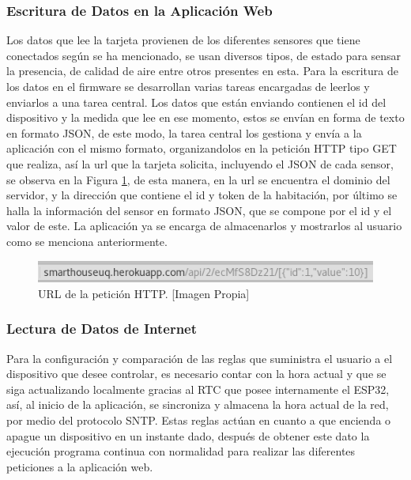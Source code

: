 \subsubsection{Escritura de Datos en la Aplicación Web}

Los datos que lee la tarjeta provienen de los diferentes sensores que tiene conectados según se ha mencionado, se usan diversos tipos, de estado para sensar la presencia, de calidad de aire entre otros presentes en esta. Para la escritura de los datos en el firmware se desarrollan varias tareas encargadas de leerlos y enviarlos a una tarea central. Los datos que están enviando contienen el id del dispositivo y la medida que lee en ese momento, estos se envían en forma de texto en formato JSON, de este modo, la tarea central los gestiona y envía a la aplicación con el mismo formato, organizandolos en la petición HTTP tipo GET que realiza, así la url que la tarjeta solicita, incluyendo el JSON de cada sensor, se observa en la Figura \ref{fig:json}, de esta manera, en la url se encuentra el dominio del servidor, y la dirección que contiene el id y token de la habitación, por último se halla la información del sensor en formato JSON, que se compone por el id y el valor de este. La aplicación ya se encarga de almacenarlos y mostrarlos al usuario como se menciona anteriormente.

\begin{figure}[H]
	\centering
	\caption[URL de la petición HTTP.]{URL de la petición HTTP. [Imagen Propia]}
	\label{fig:json}
	\includegraphics[width=0.7\linewidth]{Imagenes/JSON}
\end{figure}


\subsubsection{Lectura de Datos de Internet}

Para la configuración y comparación de las reglas que suministra el usuario a el dispositivo que desee controlar, es necesario contar con la hora actual y que se siga actualizando localmente gracias al RTC que posee internamente el ESP32, así, al inicio de la aplicación, se sincroniza y almacena la hora actual de la red, por medio del protocolo SNTP. Estas reglas actúan en cuanto a que encienda o apague un dispositivo en un instante dado, después de obtener este dato la ejecución programa continua con normalidad para realizar las diferentes peticiones a la aplicación web.\\

